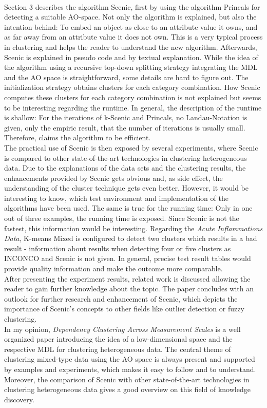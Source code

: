 \documentclass[conference]{IEEEtran}
\begin{document}
\\
Section 3 describes the algorithm Scenic, first by using the algorithm Princals for detecting a suitable AO-space. Not only the algorithm is explained, but also the intention behind: To embed an object as close to an attribute value it owns, and as far away from an attribute value it does not own. This is a very typical process in clustering and helps the reader to understand the new algorithm. Afterwards, Scenic is explained in pseudo code and by textual explanation. While the idea of the algorithm using a recursive top-down splitting strategy integrating the MDL and the AO space is straightforward, some details are hard to figure out. The initialization strategy obtains clusters for each category combination. How Scenic computes these clusters for each category combination is not explained but seems to be interesting regarding the runtime. In general, the description of the runtime is shallow: For the iterations of k-Scenic and Princals, no Landau-Notation is given, only the empiric result, that the number of iterations is usually small. Therefore, \cite{scenic} claims the algorithm to be efficient.
\\
The practical use of Scenic is then exposed by several experiments, where Scenic is compared to other state-of-the-art technologies in clustering heterogeneous data. Due to the explanations of the data sets and the clustering results, the enhancements provided by Scenic gets obvious and, as side effect, the understanding of the cluster technique gets even better. However, it would be interesting to know, which test environment and implementation of the algorithms have been used. The same is true for the running time: Only in one out of three examples, the running time is exposed. Since Scenic is not the fastest, this information would be interesting. Regarding the \textit{Acute Inflammations Data}, K-means Mixed is configured to detect two clusters which results in a bad result - information about results when detecting four or five clusters as INCONCO and Scenic is not given. In general, precise test result tables would provide quality information and make the outcome more comparable.
\\
After presenting the experiment results, related work is discussed allowing the reader to gain further knowledge about the topic. The paper concludes with an outlook for further research and enhancement of Scenic, which depicts the importance of Scenic's concepts to other fields like outlier detection or fuzzy clustering.
\\
In my opinion, \textit{Dependency Clustering Across Measurement Scales} 
 is a well organized paper introducing the idea of a low-dimensional space  and the respective MDL for clustering heterogeneous data. The central theme of clustering mixed-type data using the AO space is always present and supported by examples and experiments, which makes it easy to follow and to understand. Moreover, the comparison of Scenic with other state-of-the-art technologies in clustering heterogeneous data gives a good overview on this field of knowledge discovery.
\end{document}
